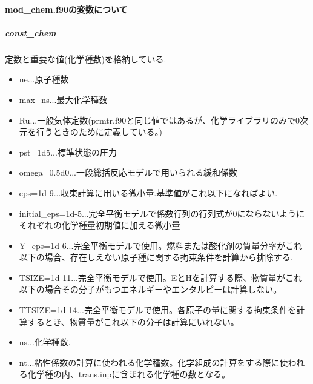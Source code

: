 \documentclass{jsarticle}
\begin{document}
\paragraph{mod\_chem.f90の変数について}
\subparagraph{const\_chem}定数と重要な値(化学種数)を格納している.
\begin{itemize}
\item ne...原子種数
\item max\_ns...最大化学種数
\item Ru...一般気体定数(prmtr.f90と同じ値ではあるが、化学ライブラリのみで0次元を行うときのために定義している。)
\item pst=1d5...標準状態の圧力
\item omega=0.5d0...一段総括反応モデルで用いられる緩和係数
\item eps=1d-9...収束計算に用いる微小量.基準値がこれ以下になればよい.
\item initial\_eps=1d-5...完全平衡モデルで係数行列の行列式が0にならないようにそれぞれの化学種量初期値に加える微小量
\item Y\_eps=1d-6...完全平衡モデルで使用。燃料または酸化剤の質量分率がこれ以下の場合、存在しえない原子種に関する拘束条件を計算から排除する.
\item TSIZE=1d-11...完全平衡モデルで使用。EとHを計算する際、物質量がこれ以下の場合その分子がもつエネルギーやエンタルピーは計算しない。
\item TTSIZE=1d-14...完全平衡モデルで使用。各原子の量に関する拘束条件を計算するとき、物質量がこれ以下の分子は計算にいれない。
\item ns...化学種数.
\item nt...粘性係数の計算に使われる化学種数。化学組成の計算をする際に使われる化学種の内、trans.inpに含まれる化学種の数となる。
\end{itemize}
\end{document}
